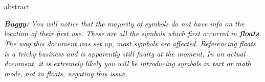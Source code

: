 \chapter*{\abstractname}%
{abstract}%
\tableofcontents%
%

\textit{\TransGlossaryHint{}}

\textcolor{mRed}{\textit{\textbf{Buggy:} You will notice that the majority of symbols do not have info on the location of their first use.
These are all the symbols which first occurred in \textbf{floats}.
The way this document was set up, most symbols are affected.
Referencing floats is a tricky business and is apparently still faulty at the moment.
In an actual document, it is extremely likely you will be introducing symbols in text or math mode, not in floats, negating this issue.}}
\printunsrtglossary[type = symbols, style = symbunitlong]
\printunsrtglossary[type = subsuper, style = mcolalttreegroup, nonumberlist]
\printunsrtglossary[type = abbreviations, style = myacr]

%

\listoffigures%

\listoftables%

%

\lstlistoflistings%

\cleardoubleoddpage%
%